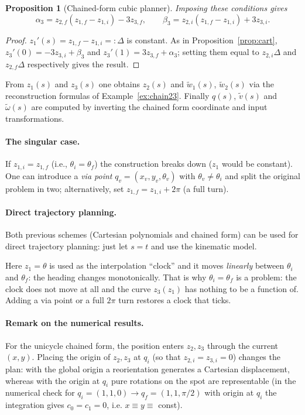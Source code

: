 \documentclass[11pt,a4paper]{article}
\def\boldsymbol#1{#1}%
\newcommand{\q}{\boldsymbol{q}}
\newcommand{\qi}{\boldsymbol{q}_i}
\newcommand{\qf}{\boldsymbol{q}_f}
\newcommand{\vt}{\tilde v}
\newcommand{\wt}{\tilde\omega}
\newcommand{\wwt}{\tilde w}
\theoremstyle{definition}
\theoremstyle{plain}
\newtheorem{proposition}[definition]{Proposition}
\theoremstyle{remark}
\begin{document}
\begin{proposition}[Chained-form cubic planner]
Imposing these conditions gives
\begin{equation}
\alpha_3=z_{2,f}(z_{1,f}-z_{1,i})-3z_{3,f},\qquad
\beta_3=z_{2,i}(z_{1,f}-z_{1,i})+3z_{3,i}.
\end{equation}
\end{proposition}
\begin{proof}
$z_1'(s)=z_{1,f}-z_{1,i}=:\Delta$ is constant. As in Proposition~\ref{prop:cart},
$z_3'(0)=-3z_{3,i}+\beta_3$ and $z_3'(1)=3z_{3,f}+\alpha_3$; setting them equal to $z_{2,i}\Delta$ and $z_{2,f}\Delta$ respectively
gives the result. \qedhere
\end{proof}

From $z_1(s)$ and $z_3(s)$ one obtains $z_2(s)$ and $\wwt_1(s)$, $\wwt_2(s)$ via the reconstruction formulas of
Example~\ref{ex:chain23}. Finally $\q(s)$, $\vt(s)$ and $\wt(s)$ are computed by inverting the chained form coordinate and
input transformations.

\paragraph{The singular case.} If $z_{1,i}=z_{1,f}$ (i.e., $\theta_i=\theta_f$) the construction breaks down ($z_1$ would be
constant). One can introduce a \emph{via point} $\q_v=(x_v,y_v,\theta_v)$ with $\theta_v\ne\theta_i$ and split the original problem
in two; alternatively, set $z_{1,f}=z_{1,i}+2\pi$ (a full turn).

\paragraph{Direct trajectory planning.} Both previous schemes (Cartesian polynomials and chained form) can be used for direct
trajectory planning: just let $s=t$ and use the kinematic model.

\begin{intuition}
Here $z_1=\theta$ is used as the interpolation ``clock'' and it moves \emph{linearly} between $\theta_i$ and $\theta_f$:
the heading changes monotonically. That is why $\theta_i=\theta_f$ is a problem: the clock does not move at all and the curve
$z_3(z_1)$ has nothing to be a function of. Adding a via point or a full $2\pi$ turn restores a clock that ticks.
\end{intuition}

\paragraph{Remark on the numerical results.} For the unicycle chained form, the position enters $z_2,z_3$ through
the current $(x,y)$. Placing the origin of $z_2,z_3$ at $\qi$ (so that $z_{2,i}=z_{3,i}=0$) changes the plan: with the global origin a
reorientation generates a Cartesian displacement, whereas with the origin at $\qi$ pure rotations on the spot are
representable (in the numerical check for $\qi=(1,1,0)\to\qf=(1,1,\pi/2)$ with origin at $\qi$ the integration gives $c_0=c_1=0$, i.e.
$x\equiv y\equiv$ const).
\end{document}
